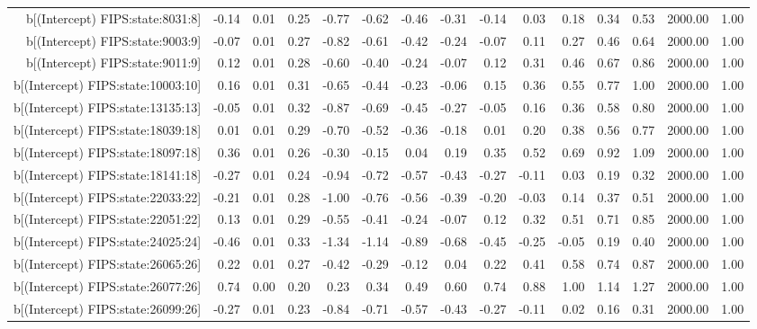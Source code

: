 \begin{table}[ht]
\begin{tabular}{rrrrrrrrrrrrrrr}
  b[(Intercept) FIPS:state:8031:8] & -0.14 & 0.01 & 0.25 & -0.77 & -0.62 & -0.46 & -0.31 & -0.14 & 0.03 & 0.18 & 0.34 & 0.53 & 2000.00 & 1.00 \\ 
  b[(Intercept) FIPS:state:9003:9] & -0.07 & 0.01 & 0.27 & -0.82 & -0.61 & -0.42 & -0.24 & -0.07 & 0.11 & 0.27 & 0.46 & 0.64 & 2000.00 & 1.00 \\ 
  b[(Intercept) FIPS:state:9011:9] & 0.12 & 0.01 & 0.28 & -0.60 & -0.40 & -0.24 & -0.07 & 0.12 & 0.31 & 0.46 & 0.67 & 0.86 & 2000.00 & 1.00 \\ 
  b[(Intercept) FIPS:state:10003:10] & 0.16 & 0.01 & 0.31 & -0.65 & -0.44 & -0.23 & -0.06 & 0.15 & 0.36 & 0.55 & 0.77 & 1.00 & 2000.00 & 1.00 \\ 
  b[(Intercept) FIPS:state:13135:13] & -0.05 & 0.01 & 0.32 & -0.87 & -0.69 & -0.45 & -0.27 & -0.05 & 0.16 & 0.36 & 0.58 & 0.80 & 2000.00 & 1.00 \\ 
  b[(Intercept) FIPS:state:18039:18] & 0.01 & 0.01 & 0.29 & -0.70 & -0.52 & -0.36 & -0.18 & 0.01 & 0.20 & 0.38 & 0.56 & 0.77 & 2000.00 & 1.00 \\ 
  b[(Intercept) FIPS:state:18097:18] & 0.36 & 0.01 & 0.26 & -0.30 & -0.15 & 0.04 & 0.19 & 0.35 & 0.52 & 0.69 & 0.92 & 1.09 & 2000.00 & 1.00 \\ 
  b[(Intercept) FIPS:state:18141:18] & -0.27 & 0.01 & 0.24 & -0.94 & -0.72 & -0.57 & -0.43 & -0.27 & -0.11 & 0.03 & 0.19 & 0.32 & 2000.00 & 1.00 \\ 
  b[(Intercept) FIPS:state:22033:22] & -0.21 & 0.01 & 0.28 & -1.00 & -0.76 & -0.56 & -0.39 & -0.20 & -0.03 & 0.14 & 0.37 & 0.51 & 2000.00 & 1.00 \\ 
  b[(Intercept) FIPS:state:22051:22] & 0.13 & 0.01 & 0.29 & -0.55 & -0.41 & -0.24 & -0.07 & 0.12 & 0.32 & 0.51 & 0.71 & 0.85 & 2000.00 & 1.00 \\ 
  b[(Intercept) FIPS:state:24025:24] & -0.46 & 0.01 & 0.33 & -1.34 & -1.14 & -0.89 & -0.68 & -0.45 & -0.25 & -0.05 & 0.19 & 0.40 & 2000.00 & 1.00 \\ 
  b[(Intercept) FIPS:state:26065:26] & 0.22 & 0.01 & 0.27 & -0.42 & -0.29 & -0.12 & 0.04 & 0.22 & 0.41 & 0.58 & 0.74 & 0.87 & 2000.00 & 1.00 \\ 
  b[(Intercept) FIPS:state:26077:26] & 0.74 & 0.00 & 0.20 & 0.23 & 0.34 & 0.49 & 0.60 & 0.74 & 0.88 & 1.00 & 1.14 & 1.27 & 2000.00 & 1.00 \\ 
  b[(Intercept) FIPS:state:26099:26] & -0.27 & 0.01 & 0.23 & -0.84 & -0.71 & -0.57 & -0.43 & -0.27 & -0.11 & 0.02 & 0.16 & 0.31 & 2000.00 & 1.00 \\ 

\end{tabular}
\end{table}
